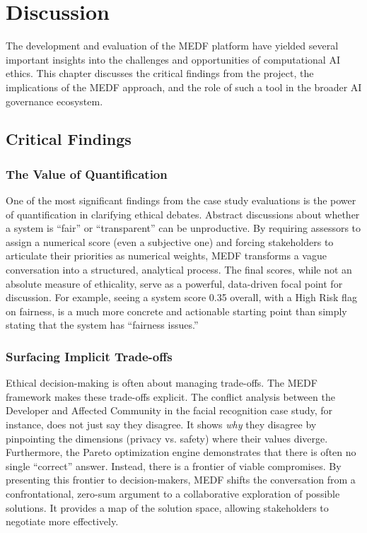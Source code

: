 \chapter{Discussion}
\label{ch:discussion}

The development and evaluation of the MEDF platform have yielded several important insights into the challenges and opportunities of computational AI ethics. This chapter discusses the critical findings from the project, the implications of the MEDF approach, and the role of such a tool in the broader AI governance ecosystem.

\section{Critical Findings}
\label{sec:findings}

\subsection{The Value of Quantification}

One of the most significant findings from the case study evaluations is the power of quantification in clarifying ethical debates. Abstract discussions about whether a system is \enquote{fair} or \enquote{transparent} can be unproductive. By requiring assessors to assign a numerical score (even a subjective one) and forcing stakeholders to articulate their priorities as numerical weights, MEDF transforms a vague conversation into a structured, analytical process. The final scores, while not an absolute measure of ethicality, serve as a powerful, data-driven focal point for discussion. For example, seeing a system score 0.35 overall, with a High Risk flag on fairness, is a much more concrete and actionable starting point than simply stating that the system has \enquote{fairness issues.}

\subsection{Surfacing Implicit Trade-offs}

Ethical decision-making is often about managing trade-offs. The MEDF framework makes these trade-offs explicit. The conflict analysis between the Developer and Affected Community in the facial recognition case study, for instance, does not just say they disagree. It shows \textit{why} they disagree by pinpointing the dimensions (privacy vs. safety) where their values diverge. Furthermore, the Pareto optimization engine demonstrates that there is often no single \enquote{correct} answer. Instead, there is a frontier of viable compromises. By presenting this frontier to decision-makers, MEDF shifts the conversation from a confrontational, zero-sum argument to a collaborative exploration of possible solutions. It provides a map of the solution space, allowing stakeholders to negotiate more effectively.

